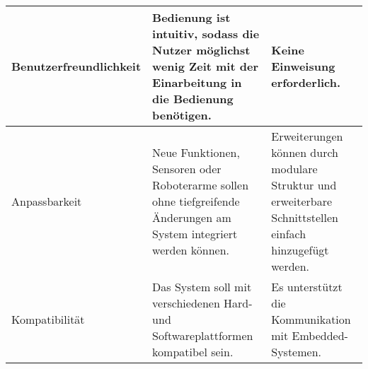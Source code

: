 \begin{longtable}{|>{\raggedright\arraybackslash}p{4cm}|>{\raggedright\arraybackslash}p{5cm}|>{\raggedright\arraybackslash}p{5cm}|}
        Benutzerfreundlichkeit & Bedienung ist intuitiv, sodass die Nutzer möglichst wenig Zeit mit der Einarbeitung in die Bedienung benötigen. 
        & Keine Einweisung erforderlich.
        \\
        \hline
		Anpassbarkeit & Neue Funktionen, Sensoren oder Roboterarme sollen ohne tiefgreifende Änderungen am System integriert werden können. & Erweiterungen können durch modulare Struktur und erweiterbare Schnittstellen einfach hinzugefügt werden. \\ 
		\hline
		Kompatibilität & Das System soll mit verschiedenen Hard- und Softwareplattformen kompatibel sein. & Es unterstützt die Kommunikation mit Embedded-Systemen. \\ 
		\hline
		\hline
        \hline
        \hline
        \hline
	
\end{longtable}




